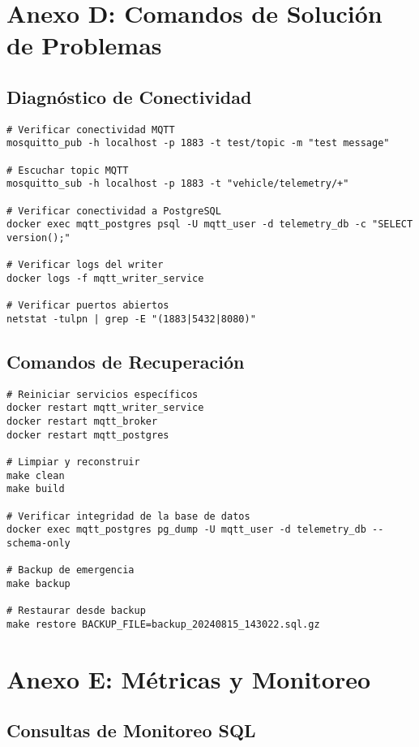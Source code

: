 \section{Anexo D: Comandos de Solución de Problemas}

\subsection{Diagnóstico de Conectividad}

\begin{verbatim}
# Verificar conectividad MQTT
mosquitto_pub -h localhost -p 1883 -t test/topic -m "test message"

# Escuchar topic MQTT
mosquitto_sub -h localhost -p 1883 -t "vehicle/telemetry/+"

# Verificar conectividad a PostgreSQL
docker exec mqtt_postgres psql -U mqtt_user -d telemetry_db -c "SELECT version();"

# Verificar logs del writer
docker logs -f mqtt_writer_service

# Verificar puertos abiertos
netstat -tulpn | grep -E "(1883|5432|8080)"
\end{verbatim}

\subsection{Comandos de Recuperación}

\begin{verbatim}
# Reiniciar servicios específicos
docker restart mqtt_writer_service
docker restart mqtt_broker
docker restart mqtt_postgres

# Limpiar y reconstruir
make clean
make build

# Verificar integridad de la base de datos
docker exec mqtt_postgres pg_dump -U mqtt_user -d telemetry_db --schema-only

# Backup de emergencia
make backup

# Restaurar desde backup
make restore BACKUP_FILE=backup_20240815_143022.sql.gz
\end{verbatim}

\section{Anexo E: Métricas y Monitoreo}

\subsection{Consultas de Monitoreo SQL}

